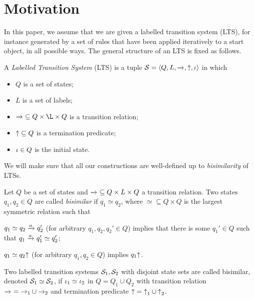 \section{Motivation}
\label{sec:motivation}

In this paper, we assume that we are given a labelled transition system (LTS), for instance generated by a set of rules that have been applied iteratively to a start object, in all possible ways. The general structure of an LTS is fixed as follows.

\begin{definition}[LTS]\label{defL;ts}
A \emph{Labelled Transition System} (LTS) is a tuple $\cS=\tupof{Q, L, {\trans{}}, {\final}, \qinit}$ in which
\begin{itemize}
\item $Q$ is a set of states;
\item $L$ is a set of labels;
\item ${\trans{}}\subseteq Q\times\L\times Q$ is a transition relation;
\item ${{\uparrow}}\subseteq Q$ is a termination predicate;
\item $\iota\in Q$ is the initial state.
\end{itemize}
\end{definition}
%
We will make sure that all our constructions are well-defined up to \emph{bisimilarity} of LTSs.
%
\begin{definition}[bisimilarity]\label{def:bisimilarity}
Let $Q$ be a set of states and ${\trans{}}\subseteq Q\times L\times Q$ a transition relation. Two states $q_1,q_2\in Q$ are called \emph{bisimilar} if $q_1\simeq q_2$, where ${\simeq}\subseteq Q\times Q$ is the largest symmetric relation such that
\begin{inumerate}
\item $q_1\simeq q_2\trans a q_2'$ (for arbitrary $q_1,q_2,q_2'\in Q$) implies that there is some $q_1'\in Q$ such that $q_1\trans a q_1'\simeq q_2'$;
\item $q_1\simeq q_2{\uparrow}$ (for arbitrary $q_1,q_2\in Q$) implies $q_1{\uparrow}$.
\end{inumerate}

Two labelled transition systems $\mathcal{S}_1,\mathcal{S}_2$ with disjoint state sets are called bisimilar, denoted $\mathcal{S}_1\simeq \mathcal{S}_2$, if $\iota_1\simeq \iota_2$ in $Q=Q_1\cup Q_2$ with transition relation ${\trans{}}={\rightarrow_1}\cup {\rightarrow_2}$ and termination predicate ${{\uparrow}}={{\uparrow}_1}\cup {{\uparrow}_2}$.
\end{definition}
%
